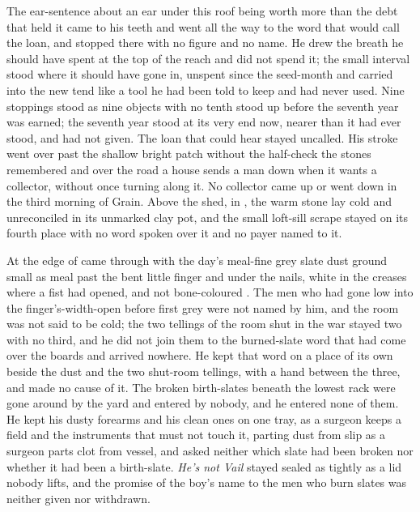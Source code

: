 The ear-sentence about an ear under this roof being worth more than the debt that held it came to his teeth and went all the way to the word that would call the loan, and stopped there with no figure and no name. He drew the breath he should have spent at the top of the reach and did not spend it; the small interval stood where it should have gone in, unspent since the seed-month and carried into the new tend like a tool he had been told to keep and had never used. Nine stoppings stood as nine objects with no tenth stood up before the seventh year was earned; the seventh year stood at its very end now, nearer than it had ever stood, and had not given. The loan that could hear stayed uncalled. His stroke went over  past the shallow bright patch without the half-check the stones remembered and over the road a house sends a man down when it wants a collector, without once turning along it. No collector came up or went down  in the third morning of Grain. Above the shed, in , the warm stone lay cold and unreconciled in its unmarked clay pot, and the small loft-sill scrape stayed on its fourth place with no word spoken over it and no payer named to it.

\scenebreak

At the edge of   came through with the day's meal-fine grey slate dust ground small as meal past the bent little finger and under the nails, white in the creases where a fist had opened, and not bone-coloured . The men who had gone low into the finger's-width-open  before first grey were not named by him, and the room was not said to be cold; the two tellings of the room shut in the war stayed two with no third, and he did not join them to the burned-slate word that had come over the boards and arrived nowhere. He kept that word on a place of its own beside the dust and the two shut-room tellings, with a hand between the three, and made no cause of it. The broken birth-slates beneath the lowest rack were gone around by the yard and entered by nobody, and he entered none of them. He kept his dusty forearms and his clean ones on one tray, as a surgeon keeps a field and the instruments that must not touch it, parting dust from slip as a surgeon parts clot from vessel, and asked neither which slate had been broken nor whether it had been a birth-slate. \emph{He's not Vail} stayed sealed as tightly as a lid nobody lifts, and the promise of the boy's name to the men who burn slates was neither given nor withdrawn.

